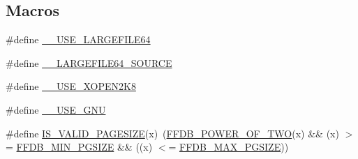 \subsection*{Macros}
\begin{DoxyCompactItemize}
\item 
\#define \mbox{\hyperlink{adat-devel_2other__libs_2filedb_2filehash_2ffdb__pagepool_8c_a285ae8236e7a984a6692acf6530cd505}{\+\_\+\+\_\+\+U\+S\+E\+\_\+\+L\+A\+R\+G\+E\+F\+I\+L\+E64}}
\item 
\#define \mbox{\hyperlink{adat-devel_2other__libs_2filedb_2filehash_2ffdb__pagepool_8c_a0ad46bd6ea251794aca41ed6eff0266a}{\+\_\+\+\_\+\+L\+A\+R\+G\+E\+F\+I\+L\+E64\+\_\+\+S\+O\+U\+R\+CE}}
\item 
\#define \mbox{\hyperlink{adat-devel_2other__libs_2filedb_2filehash_2ffdb__pagepool_8c_a55eb99244f26f6a99486bb00c529d6d1}{\+\_\+\+\_\+\+U\+S\+E\+\_\+\+X\+O\+P\+E\+N2\+K8}}
\item 
\#define \mbox{\hyperlink{adat-devel_2other__libs_2filedb_2filehash_2ffdb__pagepool_8c_adc4cc5c67b56f34138d786ef6331e3f4}{\+\_\+\+\_\+\+U\+S\+E\+\_\+\+G\+NU}}
\item 
\#define \mbox{\hyperlink{adat-devel_2other__libs_2filedb_2filehash_2ffdb__pagepool_8c_aa84e2538b999de01bd9a979db9fdeffa}{I\+S\+\_\+\+V\+A\+L\+I\+D\+\_\+\+P\+A\+G\+E\+S\+I\+ZE}}(x)~(\mbox{\hyperlink{adat__devel_2other__libs_2filedb_2filehash_2ffdb__pagepool_8h_aad891cad4d93571b9eaaf397018e623f}{F\+F\+D\+B\+\_\+\+P\+O\+W\+E\+R\+\_\+\+O\+F\+\_\+\+T\+WO}}(x) \&\& (x) $>$= \mbox{\hyperlink{adat__devel_2other__libs_2filedb_2filehash_2ffdb__pagepool_8h_a4ec72f941ddb4abac0537aad839ae0d1}{F\+F\+D\+B\+\_\+\+M\+I\+N\+\_\+\+P\+G\+S\+I\+ZE}} \&\& ((x) $<$= \mbox{\hyperlink{adat__devel_2other__libs_2filedb_2filehash_2ffdb__pagepool_8h_a160d085e2bf39c78d1adf6e1af9e7d60}{F\+F\+D\+B\+\_\+\+M\+A\+X\+\_\+\+P\+G\+S\+I\+ZE}}))
\end{DoxyCompactItemize}
